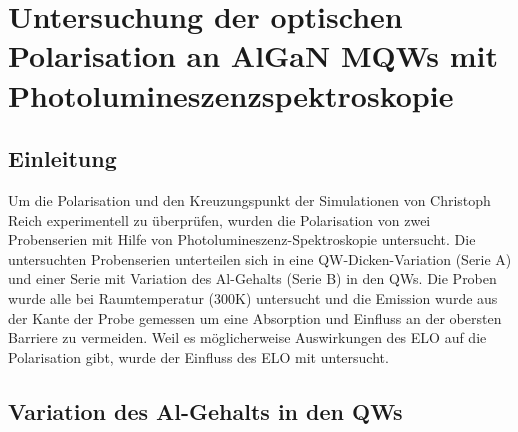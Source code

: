 \thispagestyle{fancy}

\chapter{Untersuchung der optischen Polarisation an AlGaN MQWs mit Photolumineszenzspektroskopie}
\label{chap:pol}
\section{Einleitung}
Um die Polarisation und den Kreuzungspunkt der Simulationen von Christoph Reich experimentell zu \"uberpr\"ufen, wurden die Polarisation von zwei Probenserien mit Hilfe von Photolumineszenz-Spektroskopie untersucht. Die untersuchten Probenserien unterteilen sich in eine QW-Dicken-Variation (Serie A) und einer Serie mit Variation des Al-Gehalts (Serie B) in den QWs. 
Die Proben wurde alle bei Raumtemperatur (300K) untersucht und die Emission wurde aus der Kante der Probe gemessen um eine Absorption und Einfluss an der obersten Barriere zu vermeiden. Weil es m\"oglicherweise Auswirkungen des ELO auf die Polarisation gibt, wurde der Einfluss des ELO mit untersucht. 

\section{Variation des Al-Gehalts in den QWs}

